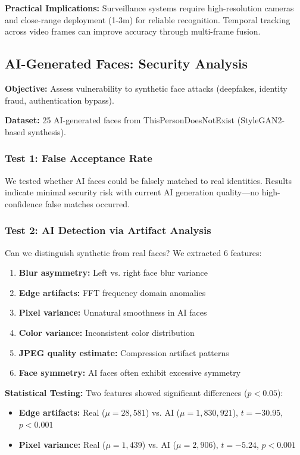 \documentclass[11pt,a4paper]{article}
\begin{document}
\textbf{Practical Implications:} Surveillance systems require high-resolution cameras and close-range deployment (1-3m) for reliable recognition. Temporal tracking across video frames can improve accuracy through multi-frame fusion.

\subsection{AI-Generated Faces: Security Analysis}

\textbf{Objective:} Assess vulnerability to synthetic face attacks (deepfakes, identity fraud, authentication bypass).

\textbf{Dataset:} 25 AI-generated faces from ThisPersonDoesNotExist (StyleGAN2-based synthesis).

\subsubsection{Test 1: False Acceptance Rate}

We tested whether AI faces could be falsely matched to real identities. Results indicate minimal security risk with current AI generation quality—no high-confidence false matches occurred.

\subsubsection{Test 2: AI Detection via Artifact Analysis}

Can we distinguish synthetic from real faces? We extracted 6 features:
\begin{enumerate}
    \item \textbf{Blur asymmetry:} Left vs. right face blur variance
    \item \textbf{Edge artifacts:} FFT frequency domain anomalies
    \item \textbf{Pixel variance:} Unnatural smoothness in AI faces
    \item \textbf{Color variance:} Inconsistent color distribution
    \item \textbf{JPEG quality estimate:} Compression artifact patterns
    \item \textbf{Face symmetry:} AI faces often exhibit excessive symmetry
\end{enumerate}

\textbf{Statistical Testing:} Two features showed significant differences ($p < 0.05$):
\begin{itemize}
    \item \textbf{Edge artifacts:} Real ($\mu=28,581$) vs. AI ($\mu=1,830,921$), $t=-30.95$, $p<0.001$
    \item \textbf{Pixel variance:} Real ($\mu=1,439$) vs. AI ($\mu=2,906$), $t=-5.24$, $p<0.001$
\end{itemize}
\end{document}
